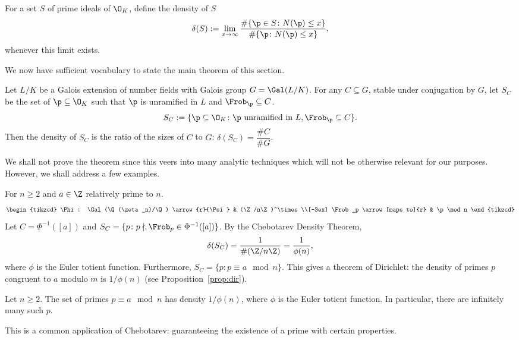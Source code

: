 \begin{dfn}[Density]
For a set $S$ of prime ideals of $\O_K$, define the density of $S$
	\[
	\delta(S):= \lim_{x \to \infty} \dfrac{\#\{ \p \in S \colon N(\p) \leq x \}}{\#\{ \p \colon N(\p) \leq x\}},
	\]
whenever this limit exists. 
\end{dfn}

We now have sufficient vocabulary to state the main theorem of this section. 


\begin{thm}
Let $L/K$ be a Galois extension of number fields with Galois group $G=\Gal(L/K)$. For any $C \subseteq G$, stable under conjugation by $G$, let $S_C$ be the set of $\p \subseteq \O_K$ such that $\p$ is unramified in $L$ and $\Frob_\p \subseteq C$. 
	\[
	S_C:=\{ \p \subseteq \O_K \colon \p \text{ unramified in }L, \Frob_\p \subseteq C\}.
	\]
Then the density of $S_C$ is the ratio of the sizes of $C$ to $G$: $\delta(S_C)= \dfrac{\#C}{\#G}$. 
\end{thm}


We shall not prove the theorem since this veers into many analytic techniques which will not be otherwise relevant for our purposes. However, we shall address a few examples.


\begin{ex}
For $n \geq 2$ and $a \in \Z$ relatively prime to $n$.
	\[
	\begin{tikzcd}
	\Phi: \Gal(\Q(\zeta_n)/\Q) \arrow{r}{\Psi} & (\Z/n\Z)^\times \\[-3ex]
	\Frob_p \arrow[maps to]{r} & \p \mod n
	\end{tikzcd}
	\]
Let $C=\Phi^{-1}([a])$ and $S_C=\{p \colon p \nmid, \Frob_p \in \Phi^{-1}([a]) \}$. By the Chebotarev Density Theorem,
	\[
	\delta(S_C)= \dfrac{1}{\#(\Z/n\Z)}= \dfrac{1}{\phi(n)},
	\]
where $\phi$ is the Euler totient function. Furthermore, $S_C=\{p \colon p \equiv a \mod n\}$. This gives a theorem of Dirichlet: the density of primes $p$ congruent to $a$ modulo $m$ is $1/\phi(n)$ (see Proposition~\ref{prop:dir}). \xqed 
\end{ex}


\begin{prop}[Dirichlet]\label{prop:dir}
Let $n \geq 2$. The set of primes $p \equiv a \mod n$ has density $1/\phi(n)$, where $\phi$ is the Euler totient function. In particular, there are infinitely many such $p$.
\end{prop}


This is a common application of Chebotarev: guaranteeing the existence of a prime with certain properties.  


